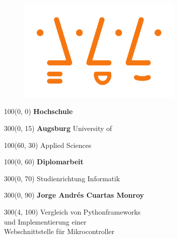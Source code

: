 \begin{titlepage}
\begin{figure}[htb]
\centering
\includegraphics[width=8cm]{images/hsaugsburglogo.png}
\label{Logo}
\end{figure}

\setlength{\TPHorizModule}{1mm}
\setlength{\TPVertModule}{1mm}


\begin{textblock}{100}(0, 0)
\fontsize{60}{15}
\selectfont
\textbf{Hochschule} 
\end{textblock}

\begin{textblock}{300}(0, 15)
\fontsize{50}{15}
\selectfont
\textbf{Augsburg} University of 
\end{textblock}

\begin{textblock}{100}(60, 30)
\fontsize{50}{15}
\selectfont
Applied Sciences 
\end{textblock}

\begin{textblock}{100}(0, 60)
\fontsize{30}{15}
\selectfont 
\textbf{Diplomarbeit} 
\end{textblock}

\begin{textblock}{300}(0, 70)
\fontsize{20}{15}
\selectfont 
Studienrichtung Informatik 
\end{textblock}

\begin{textblock}{300}(0, 90)
\fontsize{20}{15}
\selectfont 
\textbf{Jorge Andrés Cuartas Monroy}
\end{textblock}

\begin{textblock}{300}(4, 100)
\fontsize{20}{20}
\selectfont 
\parindent0mm
Vergleich von Pythonframeworks\\
und Implementierung einer\\
Webschnittstelle für Mikrocontroller
\end{textblock}


\end{titlepage}
